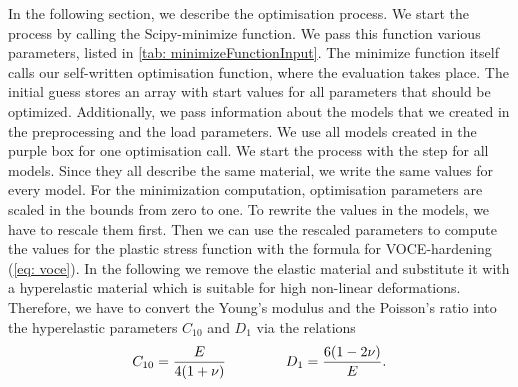 In the following section, we describe the optimisation process. We start the process by calling the Scipy-minimize function. We pass this function various parameters, listed in \autoref{tab: minimizeFunctionInput}. The minimize function itself calls our self-written optimisation function, where the evaluation takes place. The initial guess stores an array with start values for all parameters that should be optimized. Additionally, we pass information about the models that we created in the preprocessing and the load parameters. We use all models created in the purple box for one optimisation call.
We start the process with the step  for all models. Since they all describe the same material, we write the same values for every model. For the minimization computation, optimisation parameters are scaled in the bounds from zero to one. To rewrite the values in the models, we have to rescale them first. Then we can use the rescaled parameters to compute the values for the plastic stress function with the formula for VOCE-hardening (\autoref{eq: voce}). In the following we remove the elastic material and substitute it with a hyperelastic material which is suitable for high non-linear deformations. Therefore, we have to convert the Young's modulus and the Poisson's ratio into the hyperelastic parameters $C_{10}$ and $D_1$ via the relations
\begin{gather}\label{eq: elasticParams}
    C_{10} = \frac{E}{4(1+ \nu)} \hspace{1.5cm}
    D_1 = \frac{6(1-2\nu)}{E}.
\end{gather}

